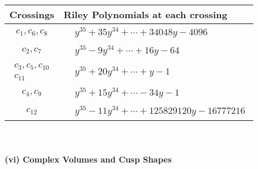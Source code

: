 \documentclass[1p]{elsarticle_modified}
\theoremstyle{definition}
\begin{document}
\begin{tabular}{m{50pt}|m{274pt}}
Crossings & \hspace{64pt}Riley Polynomials at each crossing \\
\hline $$\begin{aligned}c_{1},c_{6},c_{8}\end{aligned}$$&$\begin{aligned}
&y^{35}+35 y^{34}+\cdots+34048 y-4096
\end{aligned}$\\
\hline $$\begin{aligned}c_{2},c_{7}\end{aligned}$$&$\begin{aligned}
&y^{35}-9 y^{34}+\cdots+16 y-64
\end{aligned}$\\
\hline $$\begin{aligned}c_{3},c_{5},c_{10}\\c_{11}\end{aligned}$$&$\begin{aligned}
&y^{35}+20 y^{34}+\cdots+y-1
\end{aligned}$\\
\hline $$\begin{aligned}c_{4},c_{9}\end{aligned}$$&$\begin{aligned}
&y^{35}+15 y^{34}+\cdots-34 y-1
\end{aligned}$\\
\hline $$\begin{aligned}c_{12}\end{aligned}$$&$\begin{aligned}
&y^{35}-11 y^{34}+\cdots+125829120 y-16777216
\end{aligned}$\\
\hline
\end{tabular}\\~\\
\newpage\flushleft \textbf{(vi) Complex Volumes and Cusp Shapes}
\end{document}
